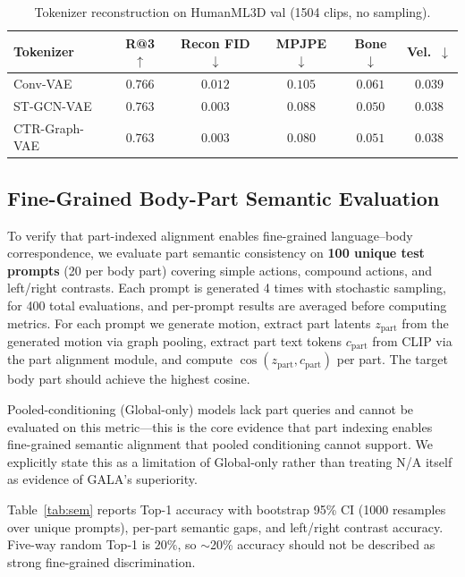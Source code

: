 \documentclass[journal]{IEEEtran}
\begin{document}
\begin{table}[t]
\centering
\caption{Tokenizer reconstruction on HumanML3D val (1504 clips, no sampling).}
\label{tab:tok}
\small
\setlength{\tabcolsep}{2.8pt}
\begin{tabular}{@{}lccccc@{}}
\toprule
Tokenizer & R@3 $\uparrow$ & Recon FID $\downarrow$ & MPJPE $\downarrow$ & Bone $\downarrow$ & Vel.\ $\downarrow$ \\
\midrule
Conv-VAE & $0.766$ & $0.012$ & $0.105$ & $0.061$ & $0.039$ \\
ST-GCN-VAE & $0.763$ & $0.003$ & $0.088$ & $0.050$ & $0.038$ \\
CTR-Graph-VAE & $0.763$ & $0.003$ & $0.080$ & $0.051$ & $0.038$ \\
\bottomrule
\end{tabular}
\end{table}

\subsection{Fine-Grained Body-Part Semantic Evaluation}
\label{sec:sem}

To verify that part-indexed alignment enables fine-grained language--body correspondence, we evaluate part semantic consistency on \textbf{100 unique test prompts} (20 per body part) covering simple actions, compound actions, and left/right contrasts. Each prompt is generated 4 times with stochastic sampling, for 400 total evaluations, and per-prompt results are averaged before computing metrics. For each prompt we generate motion, extract part latents $z_{\text{part}}$ from the generated motion via graph pooling, extract part text tokens $c_{\text{part}}$ from CLIP via the part alignment module, and compute $\cos(z_{\text{part}}, c_{\text{part}})$ per part. The target body part should achieve the highest cosine.

Pooled-conditioning (Global-only) models lack part queries and cannot be evaluated on this metric---this is the core evidence that part indexing enables fine-grained semantic alignment that pooled conditioning cannot support. We explicitly state this as a limitation of Global-only rather than treating N/A itself as evidence of GALA's superiority.

Table~\ref{tab:sem} reports Top-1 accuracy with bootstrap 95\% CI (1000 resamples over unique prompts), per-part semantic gaps, and left/right contrast accuracy. Five-way random Top-1 is $20\%$, so $\sim$20\% accuracy should not be described as strong fine-grained discrimination.
\end{document}
